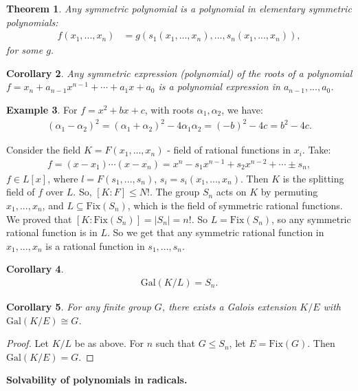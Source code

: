 \documentclass[9pt,reqno,twoside]{amsbook}
\theoremstyle{plain}
\newtheorem{theorem}{Theorem}[chapter]
\numberwithin{section}{chapter}
\numberwithin{equation}{chapter}
\newtheorem{Cor}[theorem]{Corollary}
\theoremstyle{definition}
\newtheorem{Ex}[theorem]{Example}
\theoremstyle{remark}
\theoremstyle{plain}
\newcommand{\sub}{\subseteq}
\newcommand{\bee}{\begin{equation}\begin{aligned}}
\newcommand{\eee}{\end{aligned}\end{equation}}
\newcommand{\gal}{\mathrm{Gal}}
\newcommand{\fix}{\mathrm{Fix}}
\renewcommand{\leq}{\leqslant}
\begin{document}
\begin{theorem}
Any symmetric polynomial is a polynomial in elementary symmetric polynomials:
\bee
f(x_1,...,x_n) &= g(s_1(x_1,...,x_n),...,s_n(x_1,...,x_n)),
\eee
for some $g$. 
\end{theorem}

\begin{Cor}
Any symmetric expression (polynomial) of the roots of a polynomial $f = x_n + a_{n - 1}x^{n - 1} + \cdots + a_1x + a_0$ is a polynomial expression in $a_{n - 1},...,a_0$. 
\end{Cor}

\begin{Ex}
For $f = x^2 + bx + c$, with roots $\alpha_1,\alpha_2$, we have:
\bee
(\alpha_1 - \alpha_2)^2 = (\alpha_1 + \alpha_2)^2 - 4\alpha_1\alpha_2 = (-b)^2 - 4c = b^2 - 4c. 
\eee
\end{Ex}

Consider the field $K = F(x_1,...,x_n)$ - field of rational functions in $x_i$. Take:
\bee
f = (x - x_1)\cdots (x - x_n) = x^n - s_1x^{n - 1} + s_2x^{n - 2} + \cdots \pm s_n,
\eee
$f \in L[x]$, where $l = F(s_1,...,s_n)$, $s_i = s_i(x_1,...,x_n)$. Then $K$ is the splitting field of $f$ over $L$. So, $[K:F] \leq N!$. The group $S_n$ acts on $K$ by permuting $x_1,...,x_n$, and $L \sub \fix(S_n)$, which is the field of symmetric rational functions. We proved that $[K:\fix(S_n)] = |S_n| = n!$. So $L = \fix(S_n)$, so any symmetric rational function is in $L$. So we get that any symmetric rational function in $x_1,...,x_n$ is a rational function in $s_1,...,s_n$. 

\begin{Cor}
\bee
\gal(K/L) = S_n.
\eee
\end{Cor}

\begin{Cor}
For any finite group $G$, there exists a Galois extension $K/E$ with $\gal(K/E) \cong G$. 
\end{Cor}

\begin{proof}
Let $K/L$ be as above. For $n$ such that $G \leq S_n$, let $E = \fix(G)$. Then $\gal(K/E) = G$. 
\end{proof}

\textbf{Solvability of polynomials in radicals. }
\end{document}
